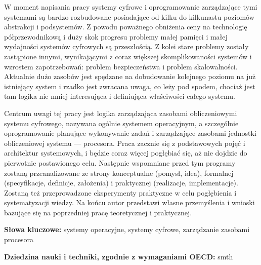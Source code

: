 \documentclass[../main]{subfiles}
\begin{document}
W moment napisania pracy systemy cyfrowe i oprogramowanie zarządzające tymi %
systemami są bardzo rozbudowane posiadające od kilku do kilkunastu poziomów abstrakcji i podsystemów. Z
powodu poważnego obniżenia ceny na technologię półprzewodnikową i duży skok progresu problemy małej
pamięci i małej wydajności systemów cyfrowych są przeszłością. Z kolei stare problemy zostały
zastąpione innymi, wynikającymi z coraz większej skomplikowaności systemów i wzrostem zapotrzebowań:
problem bezpieczeństwa i problem skalowalności. Aktualnie dużo zasobów jest spędzane na dobudowanie
kolejnego poziomu na już istniejący system i rzadko jest zwracana uwaga, co leży pod spodem, chociaż
jest tam logika nie mniej interesująca i definiująca właściwości całego systemu.

Centrum uwagi tej pracy jest logika zarządzająca zasobami obliczeniowymi systemu %
cyfrowego, nazywana ogólnie systemem operacyjnym, a szczególnie oprogramowanie planujące wykonywanie zadań
i zarządzające zasobami jednostki obliczeniowej systemu — procesora. Praca zacznie się z podstawowych
pojęć i architektur systemowych, i będzie coraz więcej pogłębiać się, aż nie dojdzie do pierwotnie
postawionego celu. Następnie wspomniane przed tym programy zostaną przeanalizowane ze strony
konceptualne (pomysł, idea), formalnej (specyfikacje, definicje, założenia) i praktycznej (realizacje,
implementacje). Zostaną też przeprowadzone eksperymenty praktyczne w celu pogłębienia i systematyzacji
wiedzy. Na końcu autor przedstawi własne przemyślenia i wnioski bazujące się na poprzedniej pracę
teoretycznej i praktycznej.

\noindent\textbf{Słowa kluczowe:} systemy operacyjne, systemy cyfrowe, zarządzanie zasobami procesora

\noindent\textbf{Dziedzina nauki i techniki, zgodnie z wymaganiami OECD:} smth %
\end{document}
